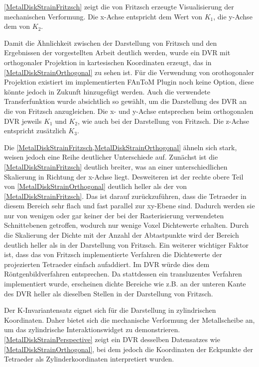 \documentclass[a4paper,fontsize=12pt,toc=bib,halfparskip,ngerman]{scrartcl}
\begin{document}
\cref{MetalDiskStrainFritzsch} zeigt die von Fritzsch erzeugte Visualisierung der mechanischen Verformung. Die x-Achse entspricht dem Wert von $K_1$, die y-Achse dem von $K_2$. 

Damit die \"Ahnlichkeit zwischen der Darstellung von Fritzsch und den Ergebnissen der vorgestellten Arbeit deutlich werden, wurde ein DVR mit orthogonaler Projektion in kartesischen Koordinaten erzeugt, das in \cref{MetalDiskStrainOrthogonal} zu sehen ist. F\"ur die Verwendung von orothogonaler Projektion existiert im implementierten FAnToM Plugin noch keine Option, diese k\"onnte jedoch in Zukunft hinzugef\"ugt werden. Auch die verwendete Transferfunktion wurde absichtlich so gew\"ahlt, um die Darstellung des DVR an die von Fritzsch anzugleichen. Die x- und y-Achse entsprechen beim orthogonalen DVR jeweils $K_1$ und $K_2$, wie auch bei der Darstellung von Fritzsch. Die z-Achse entspricht zus\"atzlich $K_3$.

Die \cref{MetalDiskStrainFritzsch,MetalDiskStrainOrthogonal} \"ahneln sich stark, weisen jedoch eine Reihe deutlicher Unterschiede auf. Zun\"achst ist die \cref{MetalDiskStrainFritzsch} deutlich breiter, was an einer unterschiedlichen Skalierung in Richtung der x-Achse liegt. Desweiteren ist der rechte obere Teil von \cref{MetalDiskStrainOrthogonal} deutlich heller als der von \cref{MetalDiskStrainFritzsch}. Das ist darauf zur\"uckzuf\"uhren, dass die Tetraeder in diesem Bereich sehr flach und fast parallel zur xy-Ebene sind. Dadurch werden sie nur von wenigen oder gar keiner der bei der Rasterisierung verwendeten Schnittebenen getroffen, wodurch nur wenige Voxel Dichtewerte erhalten. Durch die Skalierung der Dichte mit der Anzahl der Abtastpunkte wird der Bereich deutlich heller als in der Darstellung von Fritzsch. Ein weiterer wichtiger Faktor ist, dass das von Fritzsch implementierte Verfahren die Dichtewerte der projezierten Tetraeder einfach aufaddiert. Im DVR w\"urde dies dem R\"ontgenbildverfahren entsprechen. Da stattdessen ein transluzentes Verfahren implementiert wurde, erscheinen dichte Bereiche wie z.B. an der unteren Kante des DVR heller als dieselben Stellen in der Darstellung von Fritzsch. 

Der K-Invariantensatz eignet sich f\"ur die Darstellung in zylindrischen Koordinaten. Daher bietet sich die mechanische Verformung der Metallscheibe an, um das zylindrische Interaktionswidget zu demonstrieren. \cref{MetalDiskStrainPerspective} zeigt ein DVR desselben Datensatzes wie \cref{MetalDiskStrainOrthogonal}, bei dem jedoch die Koordinaten der Eckpunkte der Tetraeder als Zylinderkoordinaten interpretiert wurden.
\end{document}
